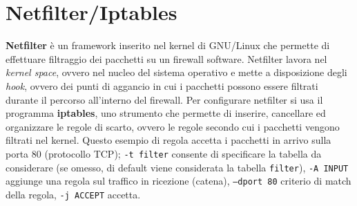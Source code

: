 \section{Netfilter/Iptables}
\textbf{Netfilter} è un framework inserito nel kernel di GNU/Linux che permette di effettuare filtraggio dei pacchetti su un firewall software. Netfilter lavora nel \textit{kernel space}, ovvero nel nucleo del sistema operativo e mette a disposizione degli \textit{hook}, ovvero dei punti di aggancio in cui i pacchetti possono essere filtrati durante il percorso all'interno del firewall. Per configurare netfilter si usa il programma \textbf{iptables}, uno strumento che permette di inserire, cancellare ed organizzare le regole di scarto, ovvero le regole secondo cui i pacchetti vengono filtrati nel kernel. Questo esempio di regola
accetta i pacchetti in arrivo sulla porta 80 (protocollo TCP); \texttt{-t filter} consente di specificare la tabella da considerare (se omesso, di default viene considerata la tabella \texttt{filter}), \texttt{-A INPUT} aggiunge una regola sul traffico in ricezione (catena), \texttt{--dport 80} criterio di match della regola, \texttt{-j ACCEPT} accetta.

